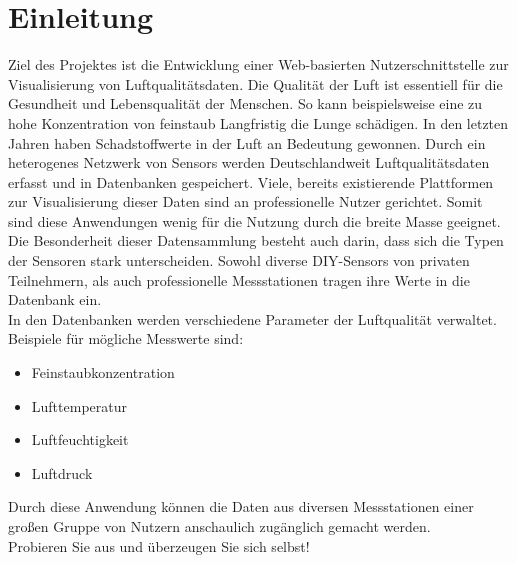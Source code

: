 \section{Einleitung}

Ziel des Projektes ist die Entwicklung einer Web-basierten Nutzerschnittstelle zur Visualisierung von Luftqualitätsdaten.
Die Qualität der Luft ist essentiell für die Gesundheit und Lebensqualität der Menschen. So kann beispielsweise eine zu hohe Konzentration von feinstaub Langfristig die Lunge schädigen. 
In den letzten Jahren haben Schadstoffwerte in der Luft an Bedeutung gewonnen.
Durch ein heterogenes Netzwerk von \glspl{Sensor} werden Deutschlandweit Luftqualitätsdaten erfasst und in Datenbanken gespeichert.
Viele, bereits existierende Plattformen zur Visualisierung dieser Daten sind an professionelle Nutzer gerichtet. Somit sind diese Anwendungen wenig für die Nutzung durch die breite Masse geeignet.
\\
Die Besonderheit dieser Datensammlung besteht auch darin, dass sich die Typen der Sensoren stark unterscheiden. Sowohl diverse \gls{DIY}-\glspl{Sensor} von privaten Teilnehmern, als auch professionelle Messstationen tragen ihre Werte in die Datenbank ein. 
\\
In den Datenbanken werden verschiedene Parameter der Luftqualität verwaltet. Beispiele für mögliche Messwerte sind:
\begin{itemize} [noitemsep]
    \item \gls{Feinstaub}konzentration
    \item Lufttemperatur
    \item Luftfeuchtigkeit
    \item Luftdruck
\end{itemize}
Durch diese Anwendung können die Daten aus diversen Messstationen einer großen Gruppe von Nutzern anschaulich zugänglich gemacht werden.\\
Probieren Sie \softwarename aus und überzeugen Sie sich selbst!